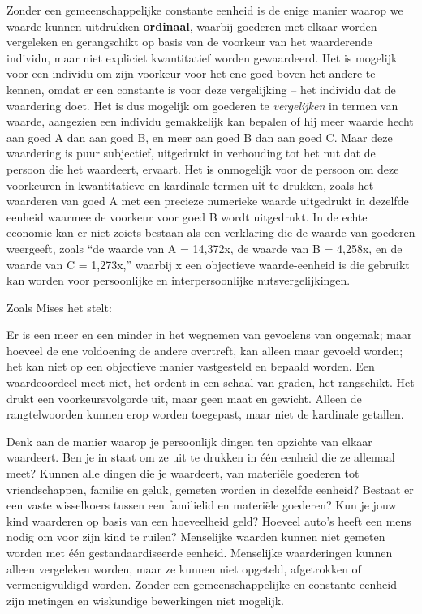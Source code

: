 Zonder een gemeenschappelijke constante eenheid is de enige manier waarop we waarde kunnen uitdrukken \textbf{ordinaal}, waarbij goederen met elkaar worden vergeleken en gerangschikt op basis van de voorkeur van het waarderende individu, maar niet expliciet kwantitatief worden gewaardeerd. Het is mogelijk voor een individu om zijn voorkeur voor het ene goed boven het andere te kennen, omdat er een constante is voor deze vergelijking – het individu dat de waardering doet. Het is dus mogelijk om goederen te \textit{vergelijken} in termen van waarde, aangezien een individu gemakkelijk kan bepalen of hij meer waarde hecht aan goed A dan aan goed B, en meer aan goed B dan aan goed C. Maar deze waardering is puur subjectief, uitgedrukt in verhouding tot het nut dat de persoon die het waardeert, ervaart. Het is onmogelijk voor de persoon om deze voorkeuren in kwantitatieve en kardinale termen uit te drukken, zoals het waarderen van goed A met een precieze numerieke waarde uitgedrukt in dezelfde eenheid waarmee de voorkeur voor goed B wordt uitgedrukt. In de echte economie kan er niet zoiets bestaan als een verklaring die de waarde van goederen weergeeft, zoals \enquote{de waarde van A = 14,372x, de waarde van B = 4,258x, en de waarde van C = 1,273x,} waarbij x een objectieve waarde-eenheid is die gebruikt kan worden voor persoonlijke en interpersoonlijke nutsvergelijkingen.

Zoals Mises het stelt:

\begin{blockquotebox}
    Er is een meer en een minder in het wegnemen van gevoelens van ongemak; maar hoeveel de ene voldoening de andere overtreft, kan alleen maar gevoeld worden; het kan niet op een objectieve manier vastgesteld en bepaald worden. Een waardeoordeel meet niet, het ordent in een schaal van graden, het rangschikt. Het drukt een voorkeursvolgorde uit, maar geen maat en gewicht. Alleen de rangtelwoorden kunnen erop worden toegepast, maar niet de kardinale getallen.\footnotemark
\end{blockquotebox}

Denk aan de manier waarop je persoonlijk dingen ten opzichte van elkaar waardeert. Ben je in staat om ze uit te drukken in één eenheid die ze allemaal meet? Kunnen alle dingen die je waardeert, van materiële goederen tot vriendschappen, familie en geluk, gemeten worden in dezelfde eenheid? Bestaat er een vaste wisselkoers tussen een familielid en materiële goederen? Kun je jouw kind waarderen op basis van een hoeveelheid geld? Hoeveel auto’s heeft een mens nodig om voor zijn kind te ruilen? Menselijke waarden kunnen niet gemeten worden met één gestandaardiseerde eenheid. Menselijke waarderingen kunnen alleen vergeleken worden, maar ze kunnen niet opgeteld, afgetrokken of vermenigvuldigd worden. Zonder een gemeenschappelijke en constante eenheid zijn metingen en wiskundige bewerkingen niet mogelijk.

